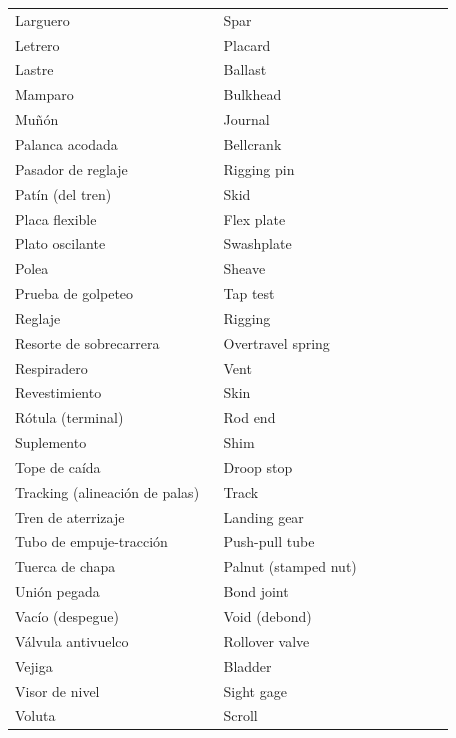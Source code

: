 {\begin{longtable}{@{}>{\raggedright\arraybackslash}p{0.45\linewidth}>{\raggedright\arraybackslash}p{0.5\linewidth}@{}}
Larguero & Spar \\
Letrero & Placard \\
Lastre & Ballast \\
Mamparo & Bulkhead \\
Muñón & Journal \\
Palanca acodada & Bellcrank \\
Pasador de reglaje & Rigging pin \\
Patín (del tren) & Skid \\
Placa flexible & Flex plate \\
Plato oscilante & Swashplate \\
Polea & Sheave \\
Prueba de golpeteo & Tap test \\
Reglaje & Rigging \\
Resorte de sobrecarrera & Overtravel spring \\
Respiradero & Vent \\
Revestimiento & Skin \\
Rótula (terminal) & Rod end \\
Suplemento & Shim \\
Tope de caída & Droop stop \\
Tracking (alineación de palas) & Track \\
Tren de aterrizaje & Landing gear \\
Tubo de empuje-tracción & Push-pull tube \\
Tuerca de chapa & Palnut (stamped nut) \\
Unión pegada & Bond joint \\
Vacío (despegue) & Void (debond) \\
Válvula antivuelco & Rollover valve \\
Vejiga & Bladder \\
Visor de nivel & Sight gage \\
Voluta & Scroll \\
\end{longtable}
}
